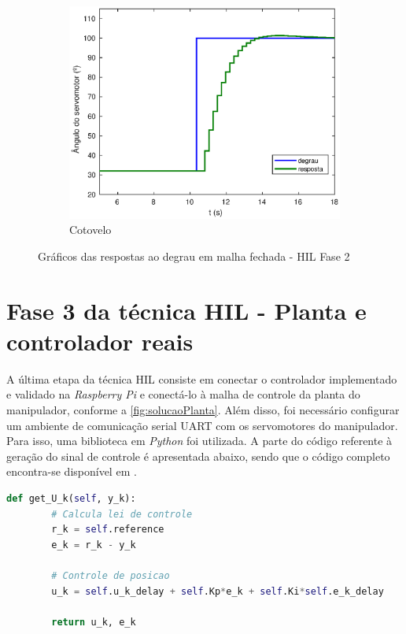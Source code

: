 \begin{figure}[h!]
\begin{subfigure}{.5\textwidth}
  \end{subfigure}%
  \\[5ex]
  \begin{subfigure}{\textwidth}
    \centering
    \includegraphics[width = 0.55\columnwidth]{Imagens/forearm_hilFase2}
    \caption{Cotovelo}
    \label{fig:forearm_hilFase2}
  \end{subfigure}%
  \caption{Gráficos das respostas ao degrau em malha fechada - HIL Fase 2}
  \label{fig:hilFase2}

\end{figure}

\section{Fase 3 da técnica HIL - Planta e controlador reais}

A última etapa da técnica HIL consiste em conectar o controlador implementado e validado 
na \textit{Raspberry Pi} e conectá-lo à malha de controle da planta do
manipulador, conforme a \autoref{fig:solucaoPlanta}. Além disso, foi necessário configurar
um ambiente de comunicação serial UART com os servomotores do manipulador. Para isso, uma
biblioteca em \textit{Python} foi utilizada. A parte do código referente à geração do sinal 
de controle é apresentada abaixo, sendo que o código completo encontra-se disponível 
em \cite{lelis_hil3}.\\[2cm]

\begin{lstlisting}[language=Python]
	def get_U_k(self, y_k):
		# Calcula lei de controle
		r_k = self.reference
		e_k = r_k - y_k
		
		# Controle de posicao
		u_k = self.u_k_delay + self.Kp*e_k + self.Ki*self.e_k_delay
		
		return u_k, e_k
\end{lstlisting}

